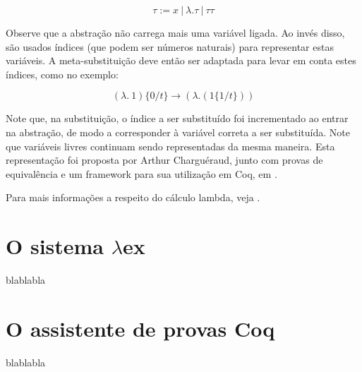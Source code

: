 \[ \tau := x\ |\ \lambda . \tau\ |\ \tau \tau \]

Observe que a abstração não carrega mais uma variável ligada. Ao invés disso,
são usados índices (que podem ser números naturais) para representar estas
variáveis. A meta-substituição deve então ser adaptada para levar em conta estes
índices, como no exemplo:

\[ (\lambda.\ 1) \{0/t\} \rightarrow ( \lambda. (1 \{1/t\}) ) \]

Note que, na substituição, o índice a ser substituído foi incrementado ao entrar
na abstração, de modo a corresponder à variável correta a ser substituída. Note
que variáveis livres continuam sendo representadas da mesma maneira. Esta
representação foi proposta por Arthur Charguéraud, junto com provas de
equivalência e um framework para sua utilização em Coq, em \cite{chargueraud}.

Para mais informações a respeito do cálculo lambda, veja \cite{barendregt}.


\section{O sistema $\lambda$ex}
blablabla


\section{O assistente de provas Coq} 
blablabla
